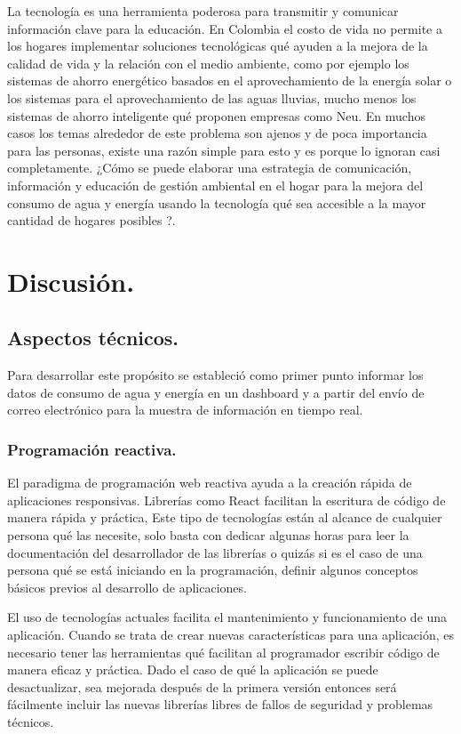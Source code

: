 \documentclass[a4paper,man,natbib]{apa6}
\begin{document}
La tecnología es una herramienta poderosa para transmitir y comunicar información clave para la educación. En Colombia el costo de vida no permite a los hogares implementar soluciones tecnológicas qué ayuden a la mejora de la calidad de vida y la relación con el medio ambiente, como por ejemplo los sistemas de ahorro energético basados en el aprovechamiento de la energía solar o los sistemas para el aprovechamiento de las aguas lluvias, mucho menos los sistemas de ahorro inteligente qué proponen empresas como Neu. En muchos casos los temas alrededor de este problema son ajenos y de poca importancia para las personas, existe una razón simple para esto y es porque lo ignoran casi completamente. ¿Cómo se puede elaborar una estrategia de comunicación, información y educación de gestión ambiental en el hogar para la mejora del consumo de agua y energía usando la tecnología qué sea accesible a la mayor cantidad de hogares posibles ?.\newline

\section{Discusión.}

\subsection{Aspectos técnicos.}
Para desarrollar este propósito se estableció como primer punto informar los datos de consumo de agua y energía en un dashboard y a partir del envío de correo electrónico para la muestra de información en tiempo real.\newline

\subsubsection{Programación reactiva.}
El paradigma de programación web reactiva ayuda a la creación rápida de aplicaciones responsivas.
Librerías como React facilitan la escritura de código de manera rápida y práctica, Este tipo de tecnologías están al alcance de cualquier persona qué las necesite, solo basta con dedicar algunas horas para leer la documentación del desarrollador de las librerías o quizás si es el caso de una persona qué se está iniciando en la programación, definir algunos conceptos básicos previos al desarrollo de aplicaciones.
\newline

El uso de tecnologías actuales facilita el mantenimiento y funcionamiento de una aplicación. Cuando se trata de crear nuevas características para una aplicación, es necesario tener las herramientas qué facilitan al programador escribir código de manera eficaz y práctica. Dado el caso de qué la aplicación se puede desactualizar, sea mejorada después de la primera versión entonces será fácilmente incluir las nuevas librerías libres de fallos de seguridad y problemas técnicos.
\newline
\end{document}
